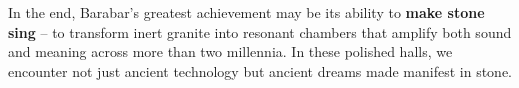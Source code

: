 \documentclass[11pt]{article}
\begin{document}
In the end, Barabar's greatest achievement may be its ability to \textbf{make stone sing} -- to transform inert granite into resonant chambers that amplify both sound and meaning across more than two millennia. In these polished halls, we encounter not just ancient technology but ancient dreams made manifest in stone.



\end{document}
